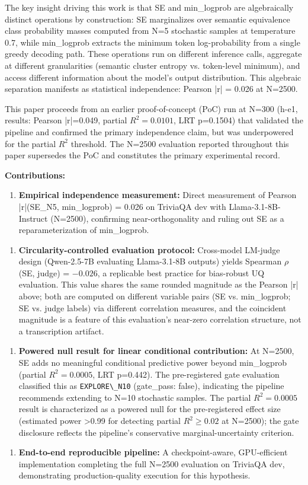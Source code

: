 The key insight driving this work is that SE and min\_logprob are algebraically distinct operations by construction: SE marginalizes over semantic equivalence class probability masses computed from N=5 stochastic samples at temperature 0.7, while min\_logprob extracts the minimum token log-probability from a single greedy decoding path. These operations run on different inference calls, aggregate at different granularities (semantic cluster entropy vs. token-level minimum), and access different information about the model's output distribution. This algebraic separation manifests as statistical independence: Pearson |r| = 0.026 at N=2500.

This paper proceeds from an earlier proof-of-concept (PoC) run at N=300 (h-e1, results: Pearson |r|=0.049, partial $R^{2}=0.0101$, LRT p=0.1504) that validated the pipeline and confirmed the primary independence claim, but was underpowered for the partial $R^2$ threshold. The N=2500 evaluation reported throughout this paper supersedes the PoC and constitutes the primary experimental record.

\textbf{Contributions:}

\begin{enumerate}
\item \textbf{Empirical independence measurement:} Direct measurement of Pearson |r|(SE\_N5, min\_logprob) = 0.026 on TriviaQA dev with Llama-3.1-8B-Instruct (N=2500), confirming near-orthogonality and ruling out SE as a reparameterization of min\_logprob.
\end{enumerate}

\begin{enumerate}
\item \textbf{Circularity-controlled evaluation protocol:} Cross-model LM-judge design (Qwen-2.5-7B evaluating Llama-3.1-8B outputs) yields Spearman $\rho$(SE, judge) = $-0.026$, a replicable best practice for bias-robust UQ evaluation. This value shares the same rounded magnitude as the Pearson |r| above; both are computed on different variable pairs (SE vs. min\_logprob; SE vs. judge labels) via different correlation measures, and the coincident magnitude is a feature of this evaluation's near-zero correlation structure, not a transcription artifact.
\end{enumerate}

\begin{enumerate}
\item \textbf{Powered null result for linear conditional contribution:} At N=2500, SE adds no meaningful conditional predictive power beyond min\_logprob (partial $R^{2}=0.0005$, LRT p=0.442). The pre-registered gate evaluation classified this as \texttt{EXPLORE\textbackslash \_N10} (gate\_pass: false), indicating the pipeline recommends extending to N=10 stochastic samples. The partial $R^{2}=0.0005$ result is characterized as a powered null for the pre-registered effect size (estimated power >0.99 for detecting partial $R^{2}\geq 0.02$ at N=2500); the gate disclosure reflects the pipeline's conservative marginal-uncertainty criterion.
\end{enumerate}

\begin{enumerate}
\item \textbf{End-to-end reproducible pipeline:} A checkpoint-aware, GPU-efficient implementation completing the full N=2500 evaluation on TriviaQA dev, demonstrating production-quality execution for this hypothesis.
\end{enumerate}

